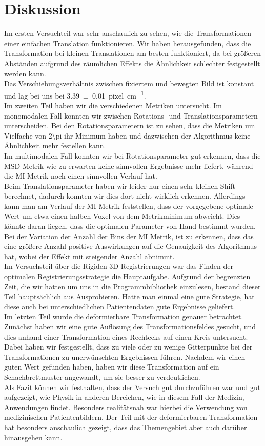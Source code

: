 \section{Diskussion}
Im ersten Versuchteil war sehr anschaulich zu sehen, wie die Transformationen
einer einfachen Translation funktionieren. Wir haben herausgefunden, dass die
Transformation bei kleinen Translationen am besten funktioniert, da bei
größeren Abständen aufgrund des räumlichen Effekts die Ähnlichkeit schlechter
festgestellt werden kann.\\
Das Verschiebungsverhältnis zwischen fixiertem und bewegten Bild ist konstant
und lag bei uns bei \SI{3.39(1)}{pixel\per\centi\meter}.\\
Im zweiten Teil haben wir die verschiedenen Metriken untersucht. Im monomodalen
Fall konnten wir zwischen Rotations- und Translationsparametern unterscheiden.
Bei den Rotationsparametern ist zu sehen, dass die Metriken um Vielfache von
\num{2\pi} ihr Minimum haben und dazwischen der Algorithmus keine Ähnlichkeit
mehr festellen kann.\\
Im multimodalen Fall konnten wir bei Rotationsparameter gut erkennen, dass die
MSD Metrik wie zu erwarten keine sinnvollen Ergebnisse mehr liefert, während
die MI Metrik noch einen sinnvollen Verlauf hat.\\
Beim Translationsparameter haben wir leider nur einen sehr kleinen Shift
berechnet, dadurch konnten wir dies dort nicht wirklich erkennen. Allerdings
kann man am Verlauf der MI Metrik feststellen, dass der vorgegebene optimale
Wert um etwa einen halben Voxel von dem Metrikminimum abweicht. Dies könnte
daran liegen, dass die optimalen Parameter von Hand bestimmt wurden.\\
Bei der Variation der Anzahl der Bins der MI Metrik, ist zu erkennen, dass das
eine größere Anzahl positive Auswirkungen auf die Genauigkeit des Algorithmus
hat, wobei der Effekt mit steigender Anzahl abnimmt.\\
Im Versuchsteil über die Rigiden 3D-Registrierungen war das Finden der
optimalen Registrierungsstrategie die Hauptaufgabe. Aufgrund der begrenzten
Zeit, die wir hatten um uns in die Programmbibliothek einzulesen, bestand
dieser Teil hauptsächlich aus Ausprobieren. Hatte man einmal eine gute
Strategie, hat diese auch bei unterschiedlichen Patientendaten gute Ergebnisse
geliefert.\\
Im letzten Teil wurde die deformierbare Transformation genauer betrachtet.
Zunächst haben wir eine gute Auflösung des Transformationsfeldes gesucht, und
dies anhand einer Transformation eines Rechtecks auf einen Kreis untersucht.
Dabei haben wir festgestellt, dass zu viele oder zu wenige Gitterpunkte bei der
Transformationen zu unerwünschten Ergebnissen führen. Nachdem wir einen guten
Wert gefunden haben, haben wir diese Transformation auf ein Schachbrettmuster
angewandt, um sie besser zu verdeutlichen.\\
Als Fazit können wir festhalten, dass der Versuch gut durchzuführen war und gut
aufgezeigt, wie Physik in anderen Bereichen, wie in diesem Fall der Medizin,
Anwendungen findet. Besonders realitätsnah war hierbei die Verwendung von
medizinischen Patientenbildern. Der Teil mit der deformierbaren Transformation
hat besonders anschaulich gezeigt, dass das Themengebiet aber auch darüber
hinausgehen kann.
